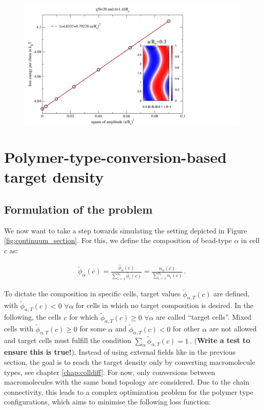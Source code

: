 \documentclass[bachelor,       %
               twoside,        %
               BCOR10mm,       %
               ngerman, english %
               ]{GAUBM}
\begin{document}


\begin{figure}[h]
    \centering
    \includegraphics[width=0.6\linewidth]{figures/bend_scft.pdf}
    \caption{}
    \label{fig:bend_scft}
\end{figure}

\chapter{Polymer-type-conversion-based target density}
\section{Formulation of the problem}
We now want to take a step towards simulating the setting depicted in Figure \ref{fig:continuum_section}. For this, we define the composition of bead-type $\alpha$ in cell $c$ as:

\begin{align}
    \tilde\phi_\alpha(c)=\frac{\hat\phi_\alpha(c)}{\sum_{i=1}^{n_t}\hat\phi_i(c)}=\frac{n_\alpha(c)}{\sum_{i=1}^{n_t}n_i(c)}\,.
\end{align}

To dictate the composition in specific cells, target values $\tilde\phi_{\alpha,T}(c)$ are defined, with $\tilde\phi_{\alpha,T}(c)<0$ $\forall\alpha$ for cells in which no target composition is desired. In the following, the cells $c$ for which $\tilde\phi_{\alpha,T}(c)\ge 0$ $\forall\alpha$ are called \enquote{target cells}. Mixed cells with $\tilde\phi_{\alpha,T}(c)\ge 0$ for some $\alpha$ and $\tilde\phi_{\alpha,T}(c)<0$ for other $\alpha$ are not allowed and target cells must fulfill the condition $\sum_\alpha\tilde\phi_{\alpha,T}(c)=1\, .$  (\textbf{Write a test to ensure this is true!}). Instead of using external fields like in the previous section, the goal is to reach the target density only by converting macromolecule types, see chapter \ref{chap:colldiff}. For now, only conversions between macromolecules with the same bond topology are considered. Due to the chain connectivity, this leads to a complex optimization problem for the polymer type configurations, which aims to minimise the following loss function:
\end{document}
